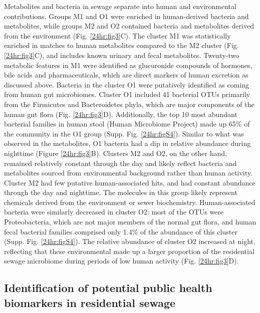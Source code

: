 Metabolites and bacteria in sewage separate into human and environmental contributions. Groups M1 and O1 were enriched in human-derived bacteria and metabolites, while groups M2 and O2 contained bacteria and metabolites derived from the environment (Fig. \ref{24hr:fig3}C). The cluster M1 was statistically enriched in matches to human metabolites compared to the M2 cluster (Fig. \ref{24hr:fig3}C), and includes known urinary and fecal metabolites. Twenty-two metabolic features in M1 were identified as glucuronide compounds of hormones, bile acids and pharmaceuticals, which are direct markers of human excretion as discussed above. Bacteria in the cluster O1 were putatively identified as coming from human gut microbiomes. Cluster O1 included 41 bacterial OTUs primarily from the Firmicutes and Bacteroidetes phyla, which are major components of the human gut flora (Fig. \ref{24hr:fig3}D). Additionally, the top 10 most abundant bacterial families in human stool (Human Microbiome Project) made up 65\% of the community in the O1 group (Supp. Fig. \ref{24hr:figS4}). Similar to what was observed in the metabolites, O1 bacteria had a dip in relative abundance during nighttime (Figure \ref{24hr:fig3}B). Clusters M2 and O2, on the other hand, remained relatively constant through the day and likely reflect bacteria and metabolites sourced from environmental background rather than human activity. Cluster M2 had few putative human-associated hits, and had constant abundance through the day and nighttime. The molecules in this group likely represent chemicals derived from the environment or sewer biochemistry. Human-associated bacteria were similarly decreased in cluster O2: most of the OTUs were Proteobacteria, which are not major members of the normal gut flora, and human fecal bacterial families comprised only 1.4\% of the abundance of this cluster (Supp. Fig. \ref{24hr:figS4}). The relative abundance of cluster O2 increased at night, reflecting that these environmental made up a larger proportion of the residential sewage microbiome during periods of low human activity (Fig. \ref{24hr:fig3}D).

\subsection{Identification of potential public health biomarkers in residential sewage}

